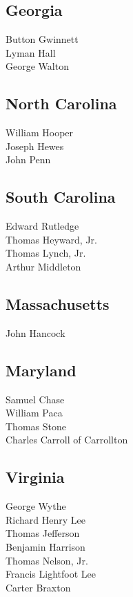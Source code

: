 \documentclass[a4paper,landscape,10pt]{article}
\begin{document}
\begin{multicols}{5}
	
\subsection*{Georgia}

Button Gwinnett\\
Lyman Hall\\
George Walton

\subsection*{North Carolina}

William Hooper\\
Joseph Hewes\\
John Penn

\subsection*{South Carolina}

Edward Rutledge\\
Thomas Heyward, Jr.\\
Thomas Lynch, Jr.\\
Arthur Middleton

\subsection*{Massachusetts}

John Hancock

\subsection*{Maryland}

Samuel Chase\\
William Paca\\
Thomas Stone\\
Charles Carroll of Carrollton

\subsection*{Virginia}

George Wythe\\
Richard Henry Lee\\
Thomas Jefferson\\
Benjamin Harrison\\
Thomas Nelson, Jr.\\
Francis Lightfoot Lee\\
Carter Braxton


\end{multicols}
\end{document}

